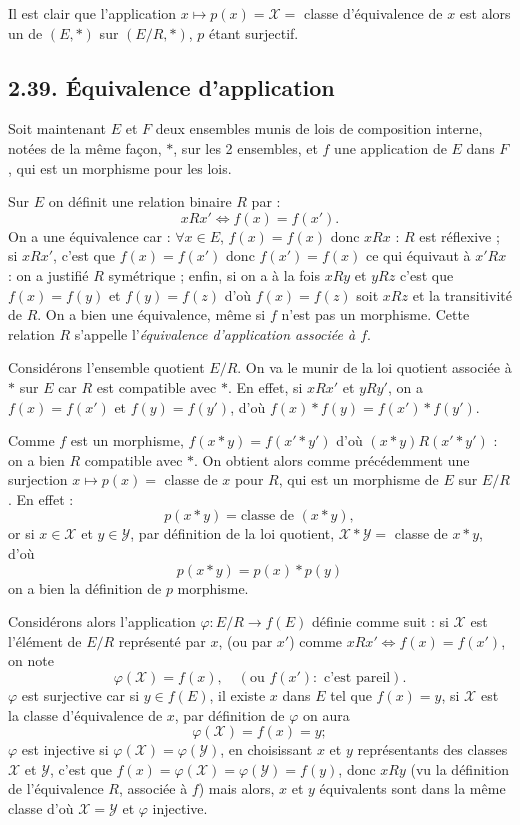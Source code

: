 Il est clair que l'application $x\mapsto p(x)=\mathcal X=$ classe d'équivalence de $x$ est alors un  de $(E,*)$ sur $(E/R,*)$, $p$ étant surjectif.

\subsection*{2.39. Équivalence d'application}

Soit maintenant $E$ et $F$ deux ensembles munis de lois de composition interne, notées de la même façon, $*$, sur les 2 ensembles, et $f$ une application de $E$ dans $F$, qui est un morphisme pour les lois.

Sur $E$ on définit une relation binaire $R$ par :
\[
xRx'\Leftrightarrow f(x)=f(x').
\]
On a une équivalence car : $\forall x\in E$, $f(x)=f(x)$ donc $xRx$ : $R$ est réflexive ; si $xRx'$, c'est que $f(x)=f(x')$ donc $f(x')=f(x)$ ce qui équivaut à $x'Rx$ : on a justifié $R$ symétrique ; enfin, si on a à la fois $xRy$ et $yRz$ c'est que $f(x)=f(y)$ et $f(y)=f(z)$ d'où $f(x)=f(z)$ soit $xRz$ et la transitivité de $R$. On a bien une équivalence, même si $f$ n'est pas un morphisme. Cette relation $R$ s'appelle l'\emph{équivalence d'application associée à $f$}. \bookend

Considérons l'ensemble quotient $E/R$. On va le munir de la loi quotient associée à $*$ sur $E$ car $R$ est compatible avec $*$. En effet, si $xRx'$ et $yRy'$, on a $f(x)=f(x')$ et $f(y)=f(y')$, d'où $f(x)*f(y)=f(x')*f(y')$.

Comme $f$ est un morphisme, $f(x*y)=f(x'*y')$ d'où $(x*y)R(x'*y')$ : on a bien $R$ compatible avec $*$. On obtient alors comme précédemment une surjection $x\mapsto p(x)=$ classe de $x$ pour $R$, qui est un morphisme de $E$ sur $E/R$. En effet :
\[
p(x*y)=\text{classe de }(x*y),
\]
or si $x\in\mathcal X$ et $y\in\mathcal Y$, par définition de la loi quotient, $\mathcal X*\mathcal Y=$ classe de $x*y$, d'où
\[
p(x*y)=p(x)*p(y)
\]
on a bien la définition de $p$ morphisme. \bookend

Considérons alors l'application $\varphi:E/R\to f(E)$ définie comme suit : si $\mathcal X$ est l'élément de $E/R$ représenté par $x$, (ou par $x'$) comme $xRx'\Leftrightarrow f(x)=f(x')$, on note
\[
\varphi(\mathcal X)=f(x),\quad(\text{ou }f(x'):\text{ c'est pareil}).
\]
$\varphi$ est surjective car si $y\in f(E)$, il existe $x$ dans $E$ tel que $f(x)=y$, si $\mathcal X$ est la classe d'équivalence de $x$, par définition de $\varphi$ on aura
\[
\varphi(\mathcal X)=f(x)=y;
\]
$\varphi$ est injective si $\varphi(\mathcal X)=\varphi(\mathcal Y)$, en choisissant $x$ et $y$ représentants des classes $\mathcal X$ et $\mathcal Y$, c'est que $f(x)=\varphi(\mathcal X)=\varphi(\mathcal Y)=f(y)$, donc $xRy$ (vu la définition de l'équivalence $R$, associée à $f$) mais alors, $x$ et $y$ équivalents sont dans la même classe d'où $\mathcal X=\mathcal Y$ et $\varphi$ injective.

